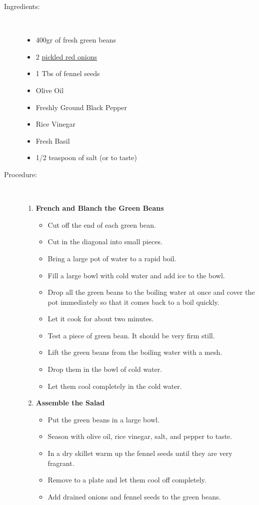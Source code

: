 \documentclass[11pt,letterpaper]{article}
\begin{document}


\begin{description}

\item[Ingredients:]\ \\
	\begin{itemize}
	\item 400gr of fresh green beans
	\item 2 \href{PickledRedOnions.html}{pickled red onions}
	\item 1 Tbs of fennel seeds
	\item Olive Oil
	\item Freshly Ground Black Pepper
	\item Rice Vinegar
	\item Fresh Basil
	\item 1/2 teaspoon of salt (or to taste)
	\end{itemize}

\item[Procedure:]\ \\
	\begin{enumerate}
	\item {\bf French and Blanch the Green Beans}
	\begin{itemize}
	\item Cut off the end of each green bean.
	\item Cut in the diagonal into small pieces.
	\item Bring a large pot of water to a rapid boil.
	\item Fill a large bowl with cold water and add ice to the bowl.
	\item Drop all the green beans to the boiling water at once and cover the pot immediately so that it comes back to a boil quickly.
	\item Let it cook for about two minutes.
	\item Test a piece of green bean. It should be very firm still.
	\item Lift the green beans from the boiling water with a mesh.
	\item Drop them in the bowl of cold water.
	\item Let them cool completely in the cold water.
	\end{itemize}
	\item {\bf Assemble the Salad}
	\begin{itemize}
	\item Put the green beans in a large bowl.
	\item Season with olive oil, rice vinegar, salt, and pepper to taste.
	\item In a dry skillet warm up the fennel seeds until they are very fragrant.
	\item Remove to a plate and let them cool off completely.
	\item Add drained onions and fennel seeds to the green beans.
	\end{itemize}
	\end{enumerate}
\end{description}
\end{document}
